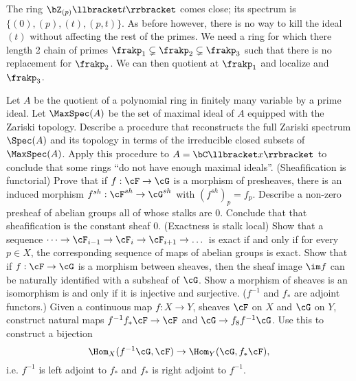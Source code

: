 \begin{homework}[e]
\begin{prf}
		The ring $\bZ_{(p)}\llbracket t\rrbracket$ comes close; its spectrum is $\{(0), (p), (t), (p,t)\}$. As before however, there is no way to kill the ideal $(t)$ without affecting the rest of the primes. We need a ring for which there length 2 chain of primes $\frakp_1 \subsetneq \frakp_2 \subsetneq \frakp_3$ such that there is no replacement for $\frakp_2$. We can then quotient at $\frakp_1$ and localize and $\frakp_3$.	
	\end{prf}
	\prob Let $A$ be the quotient of a polynomial ring in finitely many variable by a prime ideal. Let $\MaxSpec(A)$ be the set of maximal ideal of $A$ equipped with the Zariski topology. Describe a procedure that reconstructs the full Zariski spectrum $\Spec(A)$ and its topology in terms of the irreducible closed subsets of $\MaxSpec(A)$. Apply this procedure to $A = \bC\llbracket x \rrbracket$ to conclude that some rings ``do not have enough maximal ideals''.
	\prob (Sheafification is functorial) Prove that if $f:\cF \to \cG$ is a morphism of presheaves, there is an induced morphism $f^{sh}:\cF^{sh}\to \cG^{sh}$ with $(f^{sh})_p = f_p$.
	\prob Describe a non-zero presheaf of abelian groups all of whose stalks are 0. Conclude that that sheafification is the constant sheaf 0.
	\prob (Exactness is stalk local) Show that a sequence $\dots \to \cF_{i-1} \to \cF_{i} \to \cF_{i+1} \to \dots$ is exact if and only if for every $p \in X$, the corresponding sequence of maps of abelian groups is exact.
	\prob Show that if $f:\cF\to \cG$ is a morphism between sheaves, then the sheaf image $\im f$ can be naturally identified with a subsheaf of $\cG$.
	\prob Show a morphism of sheaves is an isomorphism is and only if it is injective and surjective.
	\prob ($f^{-1}$ and $f_*$ are adjoint functors.) Given a continuous map $f:X\to Y$, sheaves $\cF$ on $X$ and $\cG$ on $Y$, construct natural maps $f^{-1}f_*\cF\to \cF$ and $\cG \to f_8f^{-1}\cG$. Use this to construct a bijection
	\[
	\Hom_X(f^{-1}\cG, \cF) \to \Hom_Y(\cG, f_*\cF),
	\]
	i.e. $f^{-1}$ is left adjoint to $f_ *$ and $f_*$ is right adjoint to $f^{-1}$.


\end{homework}
